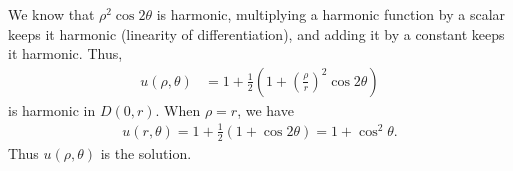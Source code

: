 \documentclass[12pt]{article}
\begin{document}
\begin{problem}[4]
We know that $ \rho^2 \cos 2 \theta$ is harmonic, multiplying a harmonic function by a scalar keeps it harmonic (linearity of differentiation), and adding it by a constant keeps it harmonic. Thus,
\begin{align*}
	u(\rho, \theta) &= 1+\frac{1}{2} \left( 1+ \left( \frac{\rho}{ r} \right)^2  \cos 2\theta \right)  
\end{align*}
is harmonic in $ D(0,r)$. When $ \rho =r$, we have
\begin{align*}
	u(r,\theta) = 1+\frac{1}{2}(1+ \cos 2 \theta) = 1+ \cos^2\theta .
\end{align*}
Thus $ u(\rho,\theta)$ is the solution.
\end{problem}


\end{document}
